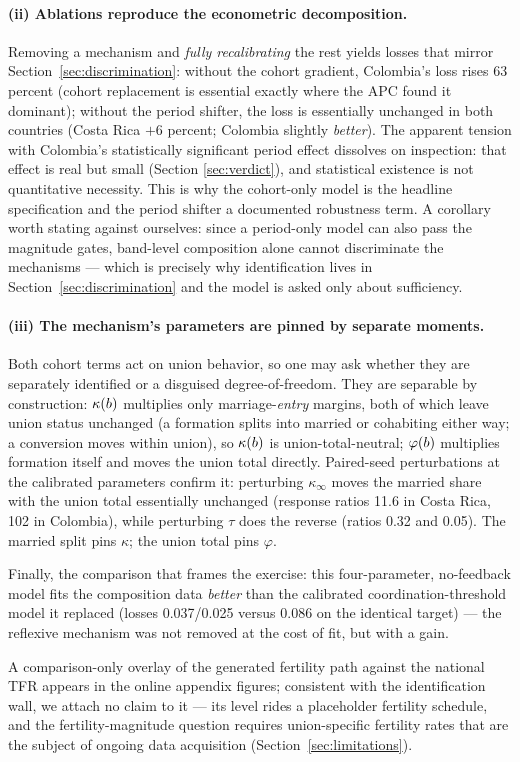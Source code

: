 \paragraph{(ii) Ablations reproduce the econometric decomposition.} Removing a
mechanism and \emph{fully recalibrating} the rest yields losses that mirror
Section~\ref{sec:discrimination}: without the cohort gradient, Colombia's loss
rises 63 percent (cohort replacement is essential exactly where the APC found
it dominant); without the period shifter, the loss is essentially unchanged in
both countries (Costa Rica $+6$ percent; Colombia slightly \emph{better}).
The apparent tension with Colombia's statistically significant period effect
dissolves on inspection: that effect is real but small (Section
\ref{sec:verdict}), and statistical existence is not quantitative necessity.
This is why the cohort-only model is the headline specification and the period
shifter a documented robustness term. A corollary worth stating against
ourselves: since a period-only model can also pass the magnitude gates,
band-level composition alone cannot discriminate the mechanisms --- which is
precisely why identification lives in Section~\ref{sec:discrimination} and the
model is asked only about sufficiency.

\paragraph{(iii) The mechanism's parameters are pinned by separate moments.}
Both cohort terms act on union behavior, so one may ask whether they are
separately identified or a disguised degree-of-freedom. They are separable by
construction: $\kappa(b)$ multiplies only marriage-\emph{entry} margins, both of
which leave union status unchanged (a formation splits into married or
cohabiting either way; a conversion moves within union), so $\kappa(b)$ is
union-total-neutral; $\varphi(b)$ multiplies formation itself and moves the union
total directly. Paired-seed perturbations at the calibrated parameters confirm
it: perturbing $\kappa_\infty$ moves the married share with the union total
essentially unchanged (response ratios 11.6 in Costa Rica, 102 in Colombia),
while perturbing $\tau$ does the reverse (ratios 0.32 and 0.05). The married
split pins $\kappa$; the union total pins $\varphi$.

Finally, the comparison that frames the exercise: this four-parameter,
no-feedback model fits the composition data \emph{better} than the calibrated
coordination-threshold model it replaced (losses 0.037/0.025 versus 0.086 on
the identical target) --- the reflexive mechanism was not removed at the cost
of fit, but with a gain.

A comparison-only overlay of the generated fertility path against the national
TFR appears in the online appendix figures; consistent with the identification
wall, we attach no claim to it --- its level rides a placeholder fertility
schedule, and the fertility-magnitude question requires union-specific
fertility rates that are the subject of ongoing data acquisition
(Section~\ref{sec:limitations}).
